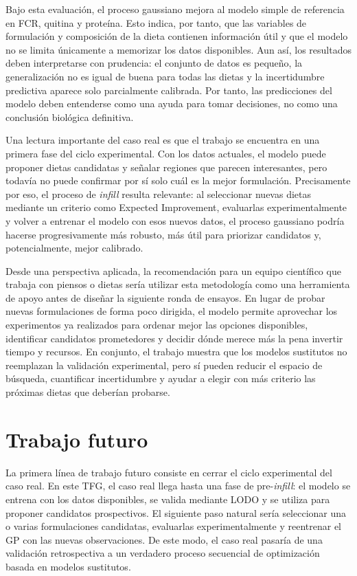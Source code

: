 Bajo esta evaluación, el proceso gaussiano mejora al modelo simple de referencia en FCR, quitina y proteína.
Esto indica, por tanto, que las variables de formulación y composición de la dieta contienen información útil y que el modelo no se limita únicamente a memorizar los datos disponibles.
Aun así, los resultados deben interpretarse con prudencia: el conjunto de datos es pequeño, la generalización no es igual de buena para todas las dietas y la incertidumbre predictiva aparece solo parcialmente calibrada.
Por tanto, las predicciones del modelo deben entenderse como una ayuda para tomar decisiones, no como una conclusión biológica definitiva.

Una lectura importante del caso real es que el trabajo se encuentra en una primera fase del ciclo experimental.
Con los datos actuales, el modelo puede proponer dietas candidatas y señalar regiones que parecen interesantes, pero todavía no puede confirmar por sí solo cuál es la mejor formulación.
Precisamente por eso, el proceso de \emph{infill} resulta relevante: al seleccionar nuevas dietas mediante un criterio como Expected Improvement, evaluarlas experimentalmente y volver a entrenar el modelo con esos nuevos datos, el proceso gaussiano podría hacerse progresivamente más robusto, más útil para priorizar candidatos y, potencialmente, mejor calibrado.

Desde una perspectiva aplicada, la recomendación para un equipo científico que trabaja con piensos o dietas sería utilizar esta metodología como una herramienta de apoyo antes de diseñar la siguiente ronda de ensayos. En lugar de probar nuevas formulaciones de forma poco dirigida, el modelo permite aprovechar los experimentos ya realizados para ordenar mejor las opciones disponibles, identificar candidatos prometedores y decidir dónde merece más la pena invertir tiempo y recursos. En conjunto, el trabajo muestra que los modelos sustitutos no reemplazan la validación experimental, pero sí pueden reducir el espacio de búsqueda, cuantificar incertidumbre y ayudar a elegir con más criterio las próximas dietas que deberían probarse.


\section{Trabajo futuro}
\label{sec:trabajo_futuro}

La primera línea de trabajo futuro consiste en cerrar el ciclo experimental del caso real. En este TFG, el caso real llega hasta una fase de pre-\emph{infill}: el modelo se entrena con los datos disponibles, se valida mediante LODO y se utiliza para proponer candidatos prospectivos. El siguiente paso natural sería seleccionar una o varias formulaciones candidatas, evaluarlas experimentalmente y reentrenar el GP con las nuevas observaciones. De este modo, el caso real pasaría de una validación retrospectiva a un verdadero proceso secuencial de optimización basada en modelos sustitutos.

